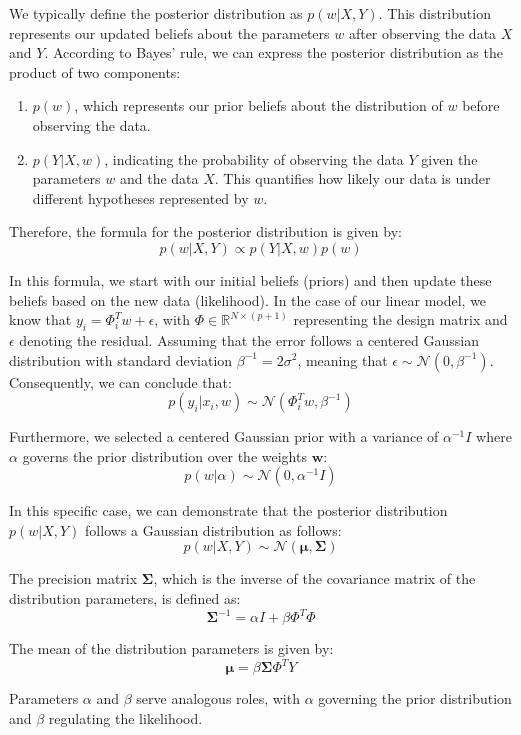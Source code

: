We typically define the posterior distribution as $ p(w | X, Y) $. This distribution represents our updated beliefs about the parameters $ w $ after observing the data $ X $ and $ Y $. According to Bayes' rule, we can express the posterior distribution as the product of two components:
\begin{enumerate}
    \item $ p(w) $, which represents our prior beliefs about the distribution of $ w $ before observing the data.
    \item $ p(Y | X, w) $, indicating the probability of observing the data $ Y $ given the parameters $ w $ and the data $ X $. This quantifies how likely our data is under different hypotheses represented by $ w $.
\end{enumerate}
Therefore, the formula for the posterior distribution is given by:
\[ p(w | X, Y) \propto p(Y | X, w) p(w) \]

In this formula, we start with our initial beliefs (priors) and then update these beliefs based on the new data (likelihood). In the case of our linear model, we know that $ y_i = \Phi^T_i w + \epsilon $, with $ \Phi \in \mathbb{R}^{N \times (p + 1)} $ representing the design matrix and $ \epsilon $ denoting the residual. Assuming that the error follows a centered Gaussian distribution with standard deviation $ \beta ^{-1} = 2\sigma^2 $, meaning that $ \epsilon \sim \mathcal{N}(0, \beta ^{-1}) $. Consequently, we can conclude that:
\[ p(y_i | x_i, w) \sim \mathcal{N}(\Phi^T_i w, \beta ^{-1}) \]

Furthermore, we selected a centered Gaussian prior with a variance of $ \alpha^{-1}I $ where $\alpha$ governs the prior distribution over the weights $\mathbf{w}$:
\[ p(w | \alpha) \sim \mathcal{N}(0, \alpha^{-1}I) \]

In this specific case, we can demonstrate that the posterior distribution $ p(w | X, Y) $ follows a Gaussian distribution as follows:
\[ p(w | X, Y) \sim \mathcal{N}(\boldsymbol{\mu}, \boldsymbol{\Sigma}) \]

The precision matrix $ \boldsymbol{\Sigma} $, which is the inverse of the covariance matrix of the distribution parameters, is defined as:
\[ \boldsymbol{\Sigma}^{-1} = \alpha I + \beta \Phi^T \Phi \]

\noindent The mean of the distribution parameters is given by:
\[ \boldsymbol{\mu} = \beta \boldsymbol{\Sigma} \Phi^T Y \]

Parameters $\alpha$ and $\beta$ serve analogous roles, with $\alpha$ governing the prior distribution and $\beta$ regulating the likelihood.

